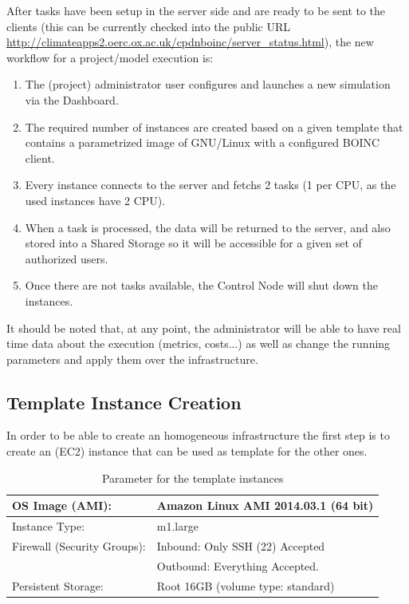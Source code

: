 \documentclass[journal abbreviation, manuscript]{copernicus}
\begin{document}


After tasks have been setup in the server side and are ready to be sent to the clients (this can be currently checked into the public URL
\url{http://climateapps2.oerc.ox.ac.uk/cpdnboinc/server_status.html}), the new workflow for a project/model execution is:

\begin{enumerate}
 \item The (project) administrator user configures and launches a new simulation via the Dashboard.
 \item The required number of instances are created based on a given template that contains a parametrized image of GNU/Linux with a configured BOINC client.
 \item Every instance connects to the server and fetchs 2 tasks (1 per CPU, as the used instances have 2 CPU).
 \item When a task is processed, the data will be returned to the server, and also stored into a Shared Storage so it will be accessible for a given set of authorized users.
 \item Once there are not tasks available, the Control Node will shut down the instances.
\end{enumerate}

It should be noted that, at any point, the administrator will be able to have real time data about the execution (metrics, costs...) as well as change the running
parameters and apply them over the infrastructure.

\subsection{Template Instance Creation}

In order to be able to create an homogeneous infrastructure the first step is to create an (EC2) instance that can be used as template for the other ones.

\begin{table}[h!]
\begin{tabular}{|l|l|}
\hline\hline
OS Image (AMI): & Amazon Linux AMI 2014.03.1 (64 bit)\\ \hline
Instance Type: & m1.large\\ \hline
Firewall (Security Groups): & Inbound: Only SSH (22) Accepted\\
\mbox{} & Outbound: Everything Accepted.\\ \hline
Persistent Storage: & Root 16GB (volume type: standard)\\ \hline\hline
\end{tabular}
\caption{Parameter for the template instances}
\label{table:templateInstanceSpecs}
\end{table}
\end{document}
